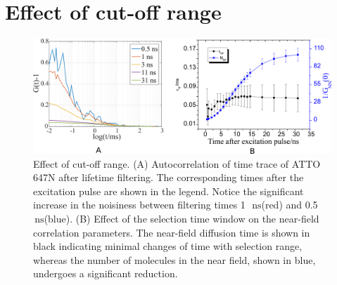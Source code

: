 \documentclass[11pt,a4paper,onecolumn]{article}
\newcommand{\ns}{\ensuremath{\,\textrm{ns}}}
\begin{document}
\section{Effect of cut-off range}
\begin{figure}[ht]
  \centering
  \includegraphics[width=\textwidth]{cutoff_effect.png}
  \makeatletter
  \renewcommand{\fnum@figure}{\figurename~S\thefigure}
  \makeatother{}
  \caption{Effect of cut-off range. (A) Autocorrelation of time trace of ATTO 647N after lifetime filtering. The corresponding times after the excitation pulse are shown in the legend. Notice the significant increase in the noisiness between filtering times 1~\ns (red) and 0.5~\ns (blue). (B) Effect of the selection time window on the near-field correlation parameters. The near-field diffusion time is shown in black indicating minimal changes of time with selection range, whereas the number of molecules in the near field, shown in blue, undergoes a significant reduction.}
  \label{SIfig:cutoff-effect}
\end{figure}
\end{document}
